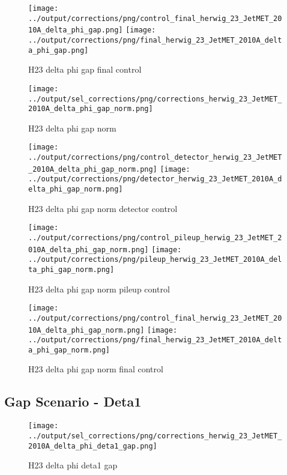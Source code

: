 \documentclass[11pt]{book}
\begin{document}
\begin{figure}[ht]
\centering
\texttt{[image: ../output/corrections/png/control\_final\_herwig\_23\_JetMET\_2010A\_delta\_phi\_gap.png]}
\texttt{[image: ../output/corrections/png/final\_herwig\_23\_JetMET\_2010A\_delta\_phi\_gap.png]}
\caption{H23 delta phi gap final control}
\label{fig:H23_JetMET_2010A_delta_phi_gap_final_control}
\end{figure}


\begin{figure}[ht]
\centering
\texttt{[image: ../output/sel\_corrections/png/corrections\_herwig\_23\_JetMET\_2010A\_delta\_phi\_gap\_norm.png]}
\caption{H23 delta phi gap norm}
\label{fig:H23_JetMET_2010A_delta_phi_gap_norm}
\end{figure}

\begin{figure}[ht]
\centering
\texttt{[image: ../output/corrections/png/control\_detector\_herwig\_23\_JetMET\_2010A\_delta\_phi\_gap\_norm.png]}
\texttt{[image: ../output/corrections/png/detector\_herwig\_23\_JetMET\_2010A\_delta\_phi\_gap\_norm.png]}
\caption{H23 delta phi gap norm detector control}
\label{fig:H23_JetMET_2010A_delta_phi_gap_norm_detector_control}
\end{figure}

\begin{figure}[ht]
\centering
\texttt{[image: ../output/corrections/png/control\_pileup\_herwig\_23\_JetMET\_2010A\_delta\_phi\_gap\_norm.png]}
\texttt{[image: ../output/corrections/png/pileup\_herwig\_23\_JetMET\_2010A\_delta\_phi\_gap\_norm.png]}
\caption{H23 delta phi gap norm pileup control}
\label{fig:H23_JetMET_2010A_delta_phi_gap_norm_pileup_control}
\end{figure}


\begin{figure}[ht]
\centering
\texttt{[image: ../output/corrections/png/control\_final\_herwig\_23\_JetMET\_2010A\_delta\_phi\_gap\_norm.png]}
\texttt{[image: ../output/corrections/png/final\_herwig\_23\_JetMET\_2010A\_delta\_phi\_gap\_norm.png]}
\caption{H23 delta phi gap norm final control}
\label{fig:H23_JetMET_2010A_delta_phi_gap_norm_final_control}
\end{figure}



\clearpage
\subsection{Gap Scenario - Deta1}
\begin{figure}[ht]
\centering
\texttt{[image: ../output/sel\_corrections/png/corrections\_herwig\_23\_JetMET\_2010A\_delta\_phi\_deta1\_gap.png]}
\caption{H23 delta phi deta1 gap}
\label{fig:H23_JetMET_2010A_delta_phi_deta1_gap}
\end{figure}
\end{document}
